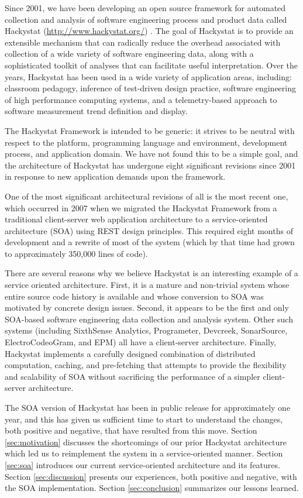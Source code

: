 \documentclass[conference,compsoc]{IEEEtran}
\begin{document}
Since 2001, we have been developing an open source framework for automated
collection and analysis of software engineering process and product data
called Hackystat (\url{http://www.hackystat.org/})
\cite{csdl2-06-06,csdl2-02-07}.  The goal of Hackystat is to provide an
extensible mechanism that can radically reduce the overhead associated with
collection of a wide variety of software engineering data, along with a
sophisticated toolkit of analyses that can facilitate useful
interpretation.  Over the years, Hackystat has been used in a wide variety
of application areas, including: classroom pedagogy,
inference of test-driven design practice, software
engineering of high performance computing systems, and a
telemetry-based approach to software measurement trend definition and
display.

The Hackystat Framework is intended to be generic: it strives to be neutral
with respect to the platform, programming language and environment,
development process, and application domain.  We have not found this to be
a simple goal, and the architecture of Hackystat has undergone eight
significant revisions since 2001 in response to new application demands
upon the framework.

One of the most significant architectural revisions of all is the most
recent one, which occurred in 2007 when we migrated the Hackystat Framework
from a traditional client-server web application architecture to a
service-oriented architecture (SOA) using REST design principles.  This
required eight months of development and a rewrite of most of the system
(which by that time had grown to approximately 350,000 lines of code).

There are several reasons why we believe Hackystat is an interesting
example of a service oriented architecture.  First, it is a mature and
non-trivial system whose entire source code history is available and whose
conversion to SOA was motivated by concrete design issues.  Second, it
appears to be the first and only SOA-based software engineering data
collection and analysis system.  Other such systems (including SixthSense
Analytics, Programeter, Devcreek, SonarSource, ElectroCodeoGram, and EPM)
all have a client-server architecture.  Finally, Hackystat implements a
carefully designed combination of distributed computation, caching, and
pre-fetching that attempts to provide the flexibility and scalability of
SOA without sacrificing the performance of a simpler client-server
architecture.

The SOA version of Hackystat has been in public release for approximately
one year, and this has given us sufficient time to start to understand the
changes, both positive and negative, that have resulted from this move.
Section \ref{sec:motivation} discusses the shortcomings of our prior
Hackystat architecture which led us to reimplement the system in a
service-oriented manner.  Section \ref{sec:soa} introduces our current
service-oriented architecture and its features.  Section
\ref{sec:discussion} presents our experiences, both positive and negative,
with the SOA implementation.  Section \ref{sec:conclusion} summarizes our
lessons learned.
\end{document}
